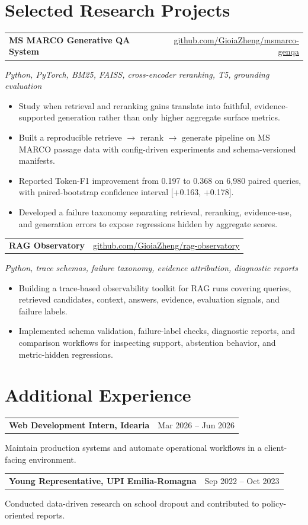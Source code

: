 \documentclass[10pt,a4paper]{article}
\makeatletter
\newcommand{\entry}[2]{
  \vspace{2pt}
  \begin{tabular*}{\textwidth}{@{}l@{\extracolsep{\fill}}r@{}}
    \textbf{#1} & #2 \\
  \end{tabular*}
}
\newcommand{\subentry}[1]{\textit{#1}\vspace{-1pt}}
\makeatother
\begin{document}
\section*{Selected Research Projects}
\entry{MS MARCO Generative QA System}{\href{https://github.com/GioiaZheng/msmarco-genqa}{github.com/GioiaZheng/msmarco-genqa}}
\subentry{Python, PyTorch, BM25, FAISS, cross-encoder reranking, T5, grounding evaluation}
\begin{itemize}
\item Study when retrieval and reranking gains translate into faithful, evidence-supported generation rather than only higher aggregate surface metrics.
\item Built a reproducible retrieve $\rightarrow$ rerank $\rightarrow$ generate pipeline on MS MARCO passage data with config-driven experiments and schema-versioned manifests.
\item Reported Token-F1 improvement from 0.197 to 0.368 on 6,980 paired queries, with paired-bootstrap confidence interval [+0.163, +0.178].
\item Developed a failure taxonomy separating retrieval, reranking, evidence-use, and generation errors to expose regressions hidden by aggregate scores.
\end{itemize}

\entry{RAG Observatory}{\href{https://github.com/GioiaZheng/rag-observatory}{github.com/GioiaZheng/rag-observatory}}
\subentry{Python, trace schemas, failure taxonomy, evidence attribution, diagnostic reports}
\begin{itemize}
\item Building a trace-based observability toolkit for RAG runs covering queries, retrieved candidates, context, answers, evidence, evaluation signals, and failure labels.
\item Implemented schema validation, failure-label checks, diagnostic reports, and comparison workflows for inspecting support, abstention behavior, and metric-hidden regressions.
\end{itemize}

\section*{Additional Experience}
\entry{Web Development Intern, Idearia}{Mar 2026 -- Jun 2026}
Maintain production systems and automate operational workflows in a client-facing environment.

\entry{Young Representative, UPI Emilia-Romagna}{Sep 2022 -- Oct 2023}
Conducted data-driven research on school dropout and contributed to policy-oriented reports.
\end{document}

